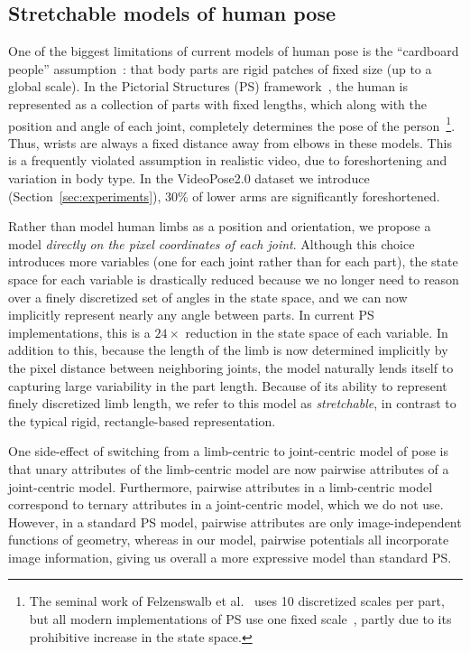 \subsection{Stretchable models of human pose}  One of the biggest limitations 
of current models of human pose is the ``cardboard people'' 
assumption~\cite{cardboard02}: that body parts are rigid patches of fixed size 
(up to a global scale).  In the Pictorial Structures (PS) framework~\cite{felzps}, the human is represented as a collection of parts with fixed lengths, 
which along with the position and angle of each joint, completely determines 
the pose of the person~\footnote{The seminal work of Felzenswalb et 
al.~\cite{felzps} uses 10 discretized scales per part, 
but all modern implementations of PS use one fixed scale~\cite{sapp2010cascades,ferrari08,andriluka09}, partly due to its prohibitive 
increase in the state space.}.  Thus, wrists are always a fixed distance away 
from elbows in these models. This is a frequently violated assumption in 
realistic video, due to foreshortening and variation in body type.  In the VideoPose2.0 dataset we  
introduce (Section~\ref{sec:experiments}), 30\% of lower arms 
are significantly foreshortened.

 Rather than model human limbs as a position 
and orientation, we propose a model {\em directly on the pixel coordinates of 
each joint}.  Although this choice introduces more variables 
(one for each joint rather than for each part), the state space for each 
variable is drastically reduced because we no longer need to reason over a 
finely discretized set of angles in the state space, and we can now implicitly 
represent nearly any angle between parts.  In current PS implementations, this is a 
$24\times$ reduction in the state space of each variable.  In addition to 
this, because the length of the limb is now determined implicitly by the pixel 
distance between neighboring joints, the model naturally lends itself to 
capturing large variability in the part length.  Because of its ability to 
represent finely discretized limb length, we refer to this model as
{\em stretchable}, in contrast to the typical rigid, rectangle-based 
representation.

One side-effect of switching from a limb-centric to joint-centric model of 
pose is that unary attributes of the limb-centric model are now pairwise 
attributes of a joint-centric model.  Furthermore, pairwise attributes in a 
limb-centric model correspond to ternary attributes in a joint-centric model, 
which we do not use.  However, in a standard PS model, pairwise attributes are 
only image-independent functions of geometry, whereas in our model, pairwise 
potentials all incorporate image information, giving us overall a more 
expressive model than standard PS. 



